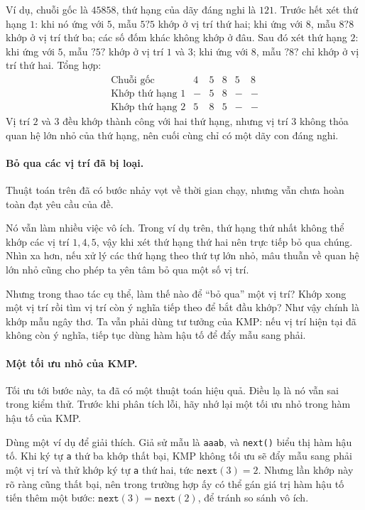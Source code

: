 \documentclass[11pt]{article}
\begin{document}
Ví dụ, chuỗi gốc là \(45858\), thứ hạng của dãy đáng nghi là \(121\). Trước
hết xét thứ hạng \(1\): khi nó ứng với \(5\), mẫu \(5?5\) khớp ở vị trí thứ
hai; khi ứng với \(8\), mẫu \(8?8\) khớp ở vị trí thứ ba; các số đốm khác
không khớp ở đâu. Sau đó xét thứ hạng \(2\): khi ứng với \(5\), mẫu \(?5?\)
khớp ở vị trí \(1\) và \(3\); khi ứng với \(8\), mẫu \(?8?\) chỉ khớp ở vị
trí thứ hai. Tổng hợp:
\[
\begin{array}{c|ccccc}
\text{Chuỗi gốc} & 4 & 5 & 8 & 5 & 8\\
\hline
\text{Khớp thứ hạng 1} & - & 5 & 8 & - & -\\
\text{Khớp thứ hạng 2} & 5 & 8 & 5 & - & -
\end{array}
\]
Vị trí \(2\) và \(3\) đều khớp thành công với hai thứ hạng, nhưng vị trí \(3\)
không thỏa quan hệ lớn nhỏ của thứ hạng, nên cuối cùng chỉ có một dãy con đáng
nghi.

\paragraph{Bỏ qua các vị trí đã bị loại.}
Thuật toán trên đã có bước nhảy vọt về thời gian chạy, nhưng vẫn chưa hoàn
toàn đạt yêu cầu của đề.

Nó vẫn làm nhiều việc vô ích. Trong ví dụ trên, thứ hạng thứ nhất không thể
khớp các vị trí \(1,4,5\), vậy khi xét thứ hạng thứ hai nên trực tiếp bỏ qua
chúng. Nhìn xa hơn, nếu xử lý các thứ hạng theo thứ tự lớn nhỏ, mâu thuẫn về
quan hệ lớn nhỏ cũng cho phép ta yên tâm bỏ qua một số vị trí.

Nhưng trong thao tác cụ thể, làm thế nào để ``bỏ qua'' một vị trí? Khớp xong
một vị trí rồi tìm vị trí còn ý nghĩa tiếp theo để bắt đầu khớp? Như vậy chính
là khớp mẫu ngây thơ. Ta vẫn phải dùng tư tưởng của KMP: nếu vị trí hiện tại
đã không còn ý nghĩa, tiếp tục dùng hàm hậu tố để đẩy mẫu sang phải.

\paragraph{Một tối ưu nhỏ của KMP.}
Tối ưu tới bước này, ta đã có một thuật toán hiệu quả. Điều lạ là nó vẫn sai
trong kiểm thử. Trước khi phân tích lỗi, hãy nhớ lại một tối ưu nhỏ trong hàm
hậu tố của KMP.

Dùng một ví dụ để giải thích. Giả sử mẫu là \texttt{aaab}, và \texttt{next()}
biểu thị hàm hậu tố. Khi ký tự \texttt{a} thứ ba khớp thất bại, KMP không tối
ưu sẽ đẩy mẫu sang phải một vị trí và thử khớp ký tự \texttt{a} thứ hai, tức
\(\texttt{next}(3)=2\). Nhưng lần khớp này rõ ràng cũng thất bại, nên trong
trường hợp ấy có thể gán giá trị hàm hậu tố tiến thêm một bước:
\(\texttt{next}(3)=\texttt{next}(2)\), để tránh so sánh vô ích.
\end{document}
